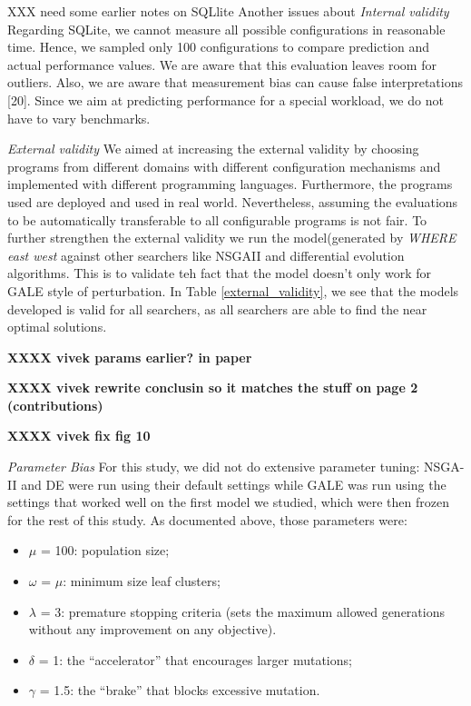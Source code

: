 \documentclass{sig-alternative}
\begin{document}
XXX need some earlier notes on SQLlite \newline Another issues about {\em Internal validity}
Regarding SQLite, we cannot measure all possible configurations in reasonable time. Hence, we sampled only 100 configurations to compare prediction and actual performance values. We are aware that this evaluation leaves room for outliers.
Also, we are aware that measurement bias can cause false interpretations [20]. Since we aim at predicting performance for a special workload, we do not have to vary benchmarks.



{\em External validity}  We aimed at increasing the external validity by choosing programs from different domains with different configuration mechanisms and implemented with different programming languages. Furthermore, the programs used are deployed and used in real world. Nevertheless, assuming the evaluations to be automatically transferable  to all configurable programs is not fair. To further strengthen the external validity we run the model(generated by \textit{WHERE east west} against other searchers like NSGAII and differential evolution algorithms\cite{storn1997differential}. This is to validate teh fact that the model doesn't only work for GALE style of perturbation. In Table \ref{external_validity}, we see that the models developed is valid for all searchers, as all searchers are able to find the near optimal solutions.


{\bf XXXX vivek params earlier? in paper  }


{\bf XXXX vivek rewrite conclusin so it matches the stuff on page 2 (contributions) }


{\bf XXXX vivek fix fig 10 }

{\em Parameter Bias} 
For this study, we did not do extensive parameter tuning:
NSGA-II and DE were run using their default
settings while GALE was run using the settings that
worked well on the first model we studied, which were
then frozen for the rest of this study. As documented
above, those parameters were:
\begin{itemize}
\item $\mu$ = 100: population size;
\item $\omega$ = $\mu$: minimum size leaf clusters;
\item $\lambda$ = 3: premature stopping criteria (sets the maximum
allowed generations without any improvement
on any objective).
\item $\delta$ = 1: the ``accelerator'' that encourages larger
mutations;
\item $\gamma$ = 1.5: the ``brake'' that blocks excessive mutation.
\end{itemize}
\end{document}
